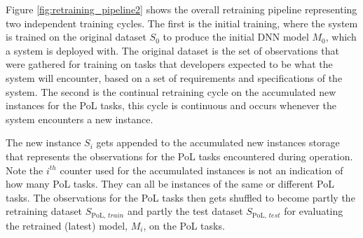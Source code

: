 Figure \ref{fig:retraining_pipeline2} shows the overall retraining pipeline representing two independent training cycles. 
%
The first is the initial training, where the system is trained on the original dataset $S_0$ to produce the initial DNN model $M_0$, which a system is deployed with. 
%
The original dataset is the set of observations that were gathered for training on tasks that developers expected to be what the system will encounter, based on a set of requirements and specifications of the system.
%
The second is the continual retraining cycle on the accumulated new instances for the PoL tasks, this cycle is continuous and occurs whenever the system encounters a new instance.
%


%
%
The new instance $S_i$ gets appended to the accumulated new instances storage that represents the observations for the PoL tasks encountered during operation.
%
Note the $i^{th}$ counter used for the accumulated instances is not an indication of how many PoL tasks. 
%
They can all be instances of the same or different PoL tasks.
%
The observations for the PoL tasks then gets shuffled to become partly the retraining dataset $S_{\text{PoL, }train}$ and partly the test dataset $S_{\text{PoL, }test}$ for evaluating the retrained (latest) model, $M_i$, on the PoL tasks. 

